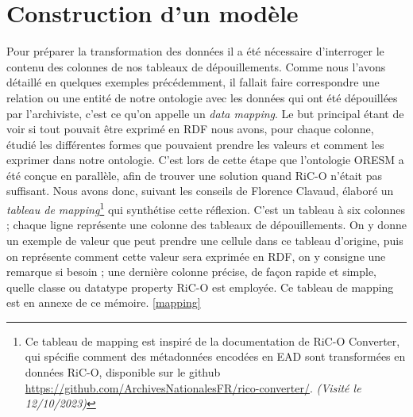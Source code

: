 \section{Construction d'un modèle}
Pour préparer la transformation des données il a été nécessaire d'interroger le contenu des colonnes de nos tableaux de dépouillements. Comme nous l'avons détaillé en quelques exemples précédemment, il fallait faire correspondre une relation ou une entité de notre ontologie avec les données qui ont été dépouillées par l'archiviste, c'est ce qu'on appelle un \textit{data mapping}. Le but principal étant de voir si tout pouvait être exprimé en RDF nous avons, pour chaque colonne, étudié les différentes formes que pouvaient prendre les valeurs et comment les exprimer dans notre ontologie. C'est lors de cette étape que l'ontologie ORESM a été conçue en parallèle, afin de trouver une solution quand RiC-O n'était pas suffisant. Nous avons donc, suivant les conseils de Florence Clavaud, élaboré un \textit{tableau de mapping}\footnote{Ce tableau de mapping est inspiré de la documentation de RiC-O Converter, qui spécifie comment des métadonnées encodées en EAD sont transformées en données RiC-O, disponible sur le github \href{https://github.com/ArchivesNationalesFR/rico-converter/blob/master/docs/EAC_to_Ric-O_0.2_documentation.xlsx}{https://github.com/ArchivesNationalesFR/rico-converter/}. \textit{(Visité le 12/10/2023)}} qui synthétise cette réflexion. C'est un tableau à six colonnes ; chaque ligne représente une colonne des tableaux de dépouillements. On y donne un exemple de valeur que peut prendre une cellule dans ce tableau d'origine, puis on représente comment cette valeur sera exprimée en RDF, on y consigne une remarque si besoin ; une dernière colonne précise, de façon rapide et simple, quelle classe ou datatype property RiC-O est employée. Ce tableau de mapping est en annexe de ce mémoire. \ref{mapping}